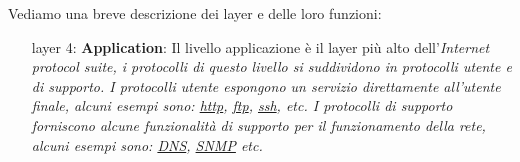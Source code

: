 Vediamo una breve descrizione dei layer e delle loro funzioni:

\begin{enumerate} %
    \item[layer 4:] \textbf{Application}: Il livello applicazione è il layer pi\`u alto dell'\it{Internet protocol suite}, i protocolli di questo livello si suddividono in protocolli utente e di supporto. \newline
        I protocolli utente espongono un servizio direttamente all'utente finale, alcuni esempi sono: \href{https://en.wikipedia.org/wiki/Hypertext_Transfer_Protocol}{http}, \href{https://en.wikipedia.org/wiki/File_Transfer_Protocol}{ftp}, \href{https://en.wikipedia.org/wiki/Secure_Shell}{ssh}, etc. \newline
        I protocolli di supporto forniscono alcune funzionalità di supporto per il funzionamento della rete, alcuni esempi sono: \href{https://en.wikipedia.org/wiki/Domain_Name_System}{DNS}, \href{https://en.wikipedia.org/wiki/Simple_Network_Management_Protocol}{SNMP} etc.

\end{enumerate}
